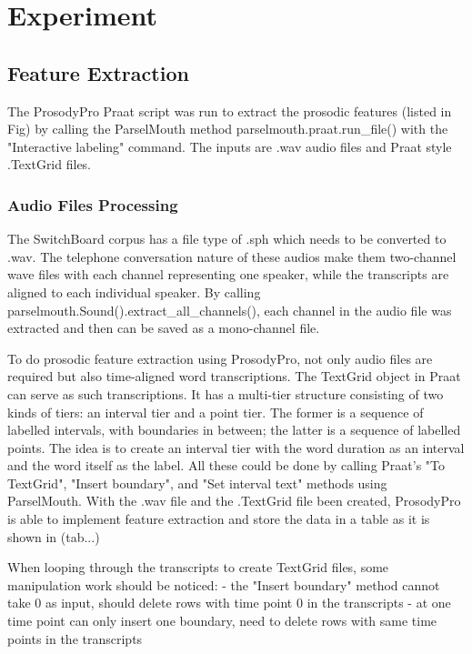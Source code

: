 \chapter{Experiment}


\section{Feature Extraction}


The ProsodyPro Praat script was run to extract the prosodic features (listed in Fig) by calling the ParselMouth method parselmouth.praat.run\_file() with the "Interactive labeling" command. The inputs are .wav audio files and Praat style .TextGrid files.  



\subsection{Audio Files Processing}
The SwitchBoard corpus has a file type of .sph which needs to be converted to .wav. The telephone conversation nature of these audios make them two-channel wave files with each channel representing one speaker, while the transcripts are aligned to each individual speaker. By calling parselmouth.Sound().extract\_all\_channels(), each channel in the audio file was extracted and then can be saved as a mono-channel file.

To do prosodic feature extraction using ProsodyPro, not only audio files are required but also time-aligned word transcriptions. The TextGrid object in Praat can serve as such transcriptions. It has a multi-tier structure consisting of two kinds of tiers: an interval tier and a point tier. The former is a sequence of labelled intervals, with boundaries in between; the latter is a sequence of labelled points. The idea is to create an interval tier with the word duration as an  interval and the word itself as the label. All these could be done by calling Praat's "To TextGrid", "Insert boundary", and "Set interval text" methods using ParselMouth. With the .wav file and the .TextGrid file been created, ProsodyPro is able to implement feature extraction and store the data in a table as it is shown in (tab...)

When looping through the transcripts to create TextGrid files, some manipulation work should be noticed:
- the "Insert boundary" method cannot take 0 as input, should delete rows with time point 0 in the transcripts
- at one time point can only insert one boundary, need to delete rows with same time points in the transcripts


